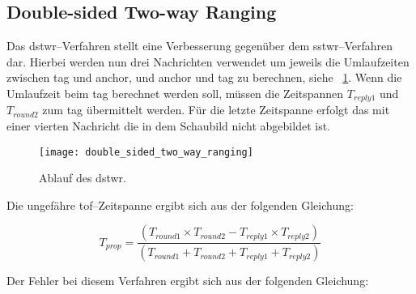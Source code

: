 \begin{comment}
------------------------------------------------------------------------------------------
- \cite{decawave2016dw1kusermanual}
	- Where the clock in device A runs at ka times the desired frequency and the clock in device B runs at kb times the desired frequency and both ka & kb are close to 1.
	- To give some idea of the size of this error, if devices A and B have clocks where each are 20 ppm away (the worst case specification) from the nominal clock in directions which make their combined error additive and equal to 40 ppm, then ka and kb might both be 0.99998 or 1.00002.
	- Even with a relatively large UWB operating range of say 100 m, the TOF is just 333 ns, so the error is 20 × 10-6 × 333 × 10-9 seconds, which is 6.7 × 10-12 seconds or 6.7 picoseconds which is approximately 2.2 mm.
\end{comment}
\subsection{Double-sided Two-way Ranging}
\label{subsec:double_sided_two_way_ranging}

Das \Gls{dstwr}--Verfahren stellt eine Verbesserung gegenüber dem \Gls{sstwr}--Verfahren dar. Hierbei werden nun drei Nachrichten verwendet um jeweils die Umlaufzeiten zwischen \Gls{tag} und \Gls{anchor}, und \Gls{anchor} und \Gls{tag} zu berechnen, siehe \figurename~\ref{fig:double_sided_two_way_ranging}. Wenn die Umlaufzeit beim \Gls{tag} berechnet werden soll, müssen die Zeitspannen $T_{reply1}$ und $T_{round2}$ zum \Gls{tag} übermittelt werden. Für die letzte Zeitspanne erfolgt das mit einer vierten Nachricht die in dem Schaubild nicht abgebildet ist. \cite{decawave2015twr, decawave2016dw1kusermanual}

\begin{figure}[ht]
	\centering
	\texttt{[image: double\_sided\_two\_way\_ranging]}
	\caption{Ablauf des \acrlong{dstwr}.}
	\label{fig:double_sided_two_way_ranging}
\end{figure}

Die ungefähre \Gls{tof}--Zeitspanne ergibt sich aus der folgenden Gleichung:

\[T_{prop}=\frac{\left(T_{round1}\times T_{round2}-T_{reply1}\times T_{reply2}\right)}{\left(T_{round1}+T_{round2}+T_{reply1}+T_{reply2}\right)}\]

Der Fehler bei diesem Verfahren ergibt sich aus der folgenden Gleichung:


